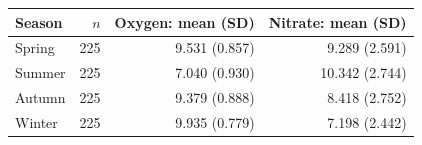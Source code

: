 \begin{tabular}{lrrr}
\toprule
Season & $n$ & Oxygen: mean (SD) & Nitrate: mean (SD) \\
\midrule
Spring & 225 & 9.531 (0.857) & 9.289 (2.591) \\
Summer & 225 & 7.040 (0.930) & 10.342 (2.744) \\
Autumn & 225 & 9.379 (0.888) & 8.418 (2.752) \\
Winter & 225 & 9.935 (0.779) & 7.198 (2.442) \\
\bottomrule
\end{tabular}
